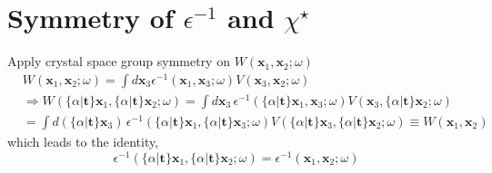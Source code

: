 \documentclass[11pt, oneside]{article}          %
\begin{document}
\section{Symmetry of $\epsilon^{-1}$ and $\chi^{\star}$}
\label{sec:symmetry-epsilon-1}

Apply crystal space group symmetry on $W({\bm x}_1,{\bm x}_2;\omega)$
\begin{equation}
  \label{eq:W_sym_R}
  \begin{aligned}
    & W({\bm x}_1,{\bm x}_2;\omega) = \int d{\bm x}_3 \epsilon^{-1}({\bm x}_1,{\bm x}_3;\omega) V({\bm x}_3,{\bm x}_2;\omega) \\
    & \Rightarrow W(\{\alpha | {\bm t} \} {\bm x}_1, \{ \alpha | {\bm t} \} {\bm x}_2;\omega) = \int d {\bm x}_3 \, \epsilon^{-1}(\{\alpha | {\bm t} \}{\bm x}_1,{\bm x}_3;\omega) V({\bm x}_3,\{\alpha | {\bm t} \} {\bm x}_2;\omega) \\
    & = \int d \left ( \{\alpha | {\bm t} \} {\bm x}_3 \right ) \, \epsilon^{-1}(\{\alpha | {\bm t} \}{\bm x}_1,\{\alpha | {\bm t} \}{\bm x}_3;\omega) V( \{\alpha | {\bm t} \}{\bm x}_3,\{\alpha | {\bm t} \} {\bm x}_2;\omega) \equiv W({\bm x}_1,{\bm x}_2)
  \end{aligned}
\end{equation}
which leads to the identity,
\begin{equation}
  \label{eq:epsilon_R}
  \epsilon^{-1}(\{\alpha | {\bm t} \} {\bm x}_1, \{\alpha | {\bm t} \}{\bm x}_2;\omega) = \epsilon^{-1}({\bm x}_1,{\bm x}_2;\omega)
\end{equation}
\end{document}
